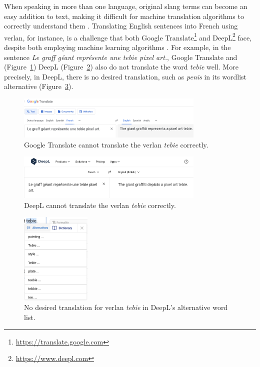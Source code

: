 \documentclass[12pt]{article}
\begin{document}
When speaking in more than one language, original slang terms can become an easy addition to text, making it difficult for machine translation algorithms to correctly understand them \cite{hajiyeva2025}. Translating English sentences into French using verlan, for instance, is a challenge that both Google Translate\footnote{\url{https://translate.google.com}} and DeepL\footnote{\url{https://www.deepl.com}} face, despite both employing machine learning algorithms \cite{deepl2020, wu2016}. For example, in the sentence \textit{Le graff géant représente une tebie pixel art.}, Google Translate and (Figure~\ref{fig:google_verlan}) DeepL (Figure~\ref{fig:deepl_verlan}) also do not translate the word \textit{tebie} well. More precisely, in DeepL, there is no desired translation, such as \textit{penis} in its wordlist alternative (Figure~\ref{fig:deepl_alt_text}).

\begin{figure}[H]
\centering
\includegraphics[width=0.8\textwidth]{figures/google_verlan.png}
\caption{\label{fig:google_verlan}Google Translate cannot translate the verlan \textit{tebie} correctly.}
\end{figure}

\begin{figure}[H]
\centering
\includegraphics[width=0.8\textwidth]{figures/deepl_verlan.png}
\caption{\label{fig:deepl_verlan}DeepL cannot translate the verlan \textit{tebie} correctly.}
\end{figure}

\begin{figure}[H]
\centering
\includegraphics[width=0.3\textwidth]{figures/deepl_alt_text.png}
\caption{\label{fig:deepl_alt_text}No desired translation for verlan \textit{tebie} in DeepL's alternative word list.}
\end{figure}
\end{document}

